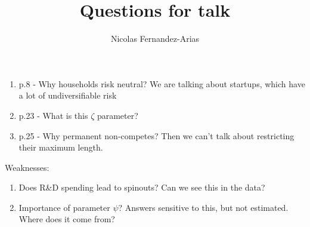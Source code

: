 \documentclass[12pt,english]{article}
\theoremstyle{remark}
\begin{document}
	
	
	
\title{Questions for talk}
\author{Nicolas Fernandez-Arias}
\maketitle

\begin{enumerate}
	\item p.8 - Why households risk neutral? We are talking about startups, which have a lot of undiversifiable risk
	\item p.23 - What is this $\zeta$ parameter?
	\item p.25 - Why permanent non-competes? Then we can't talk about restricting their maximum length.
\end{enumerate}

Weaknesses:
\begin{enumerate}
	\item Does R\&D spending lead to spinouts? Can we see this in the data?
	\item Importance of parameter $\psi$? Answers sensitive to this, but not estimated. Where does it come from?
\end{enumerate}
\end{document}
